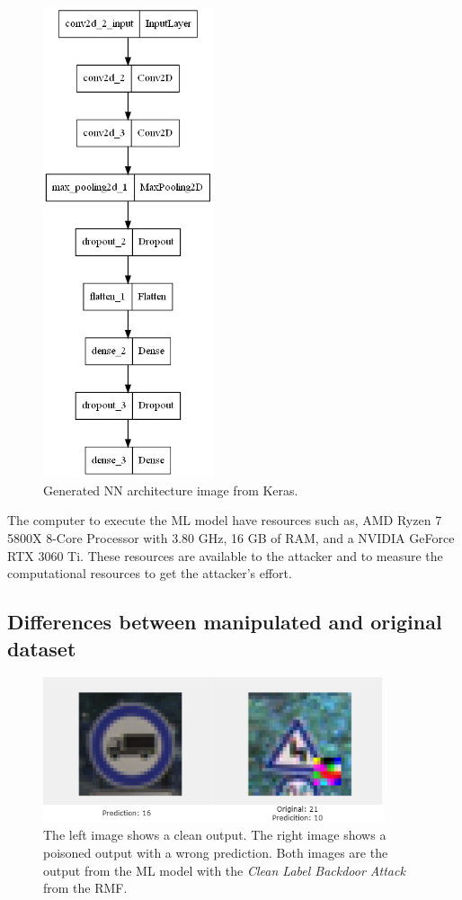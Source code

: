 \begin{figure}[h!]
  \centering
  \includegraphics[width=5cm]{pictures/nn.png}
  \caption{Generated NN architecture image from Keras.}
  \label{fig:nn}
\end{figure}

The computer to execute the ML model have resources such as, AMD Ryzen \cite{DBLP:conf/hotchips/AroraBW20} 7 5800X 8-Core Processor with 3.80 GHz, 16 GB of RAM, and a NVIDIA GeForce RTX \cite{DBLP:journals/pcs/SanzharovFG20} 3060 Ti. These resources are available to the attacker and to measure the computational resources to get the attacker's effort.

\subsection{Differences between manipulated and original dataset}

\begin{figure}[ht!]
  \centering
  \includegraphics[width=10cm]{pictures/backdoor_example_rmf.png}
  \caption{The left image shows a clean output. The right image shows a poisoned output with a wrong prediction. Both images are the output from the ML model with the \textit{Clean Label Backdoor Attack} from the RMF.}
  \label{fig:backdoor_example_rmf}
\end{figure}

